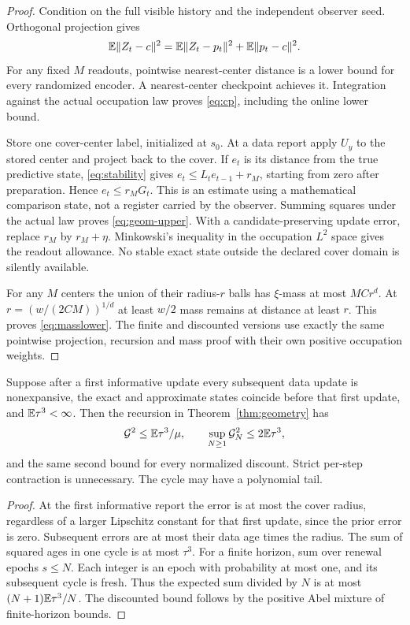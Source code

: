 \begin{proof}
Condition on the full visible history and the independent observer seed. Orthogonal projection gives
\[
 \mathbb E\lVert Z_t-c\rVert^2=\mathbb E\lVert Z_t-p_t\rVert^2+\mathbb E\lVert p_t-c\rVert^2.
\]
For any fixed $M$ readouts, pointwise nearest-center distance is a lower bound for every randomized encoder. A nearest-center checkpoint achieves it. Integration against the actual occupation law proves \eqref{eq:cp}, including the online lower bound.

Store one cover-center label, initialized at $s_0$. At a data report apply $U_y$ to the stored center and project back to the cover. If $e_t$ is its distance from the true predictive state, \eqref{eq:stability} gives $e_t\le L_te_{t-1}+r_M$, starting from zero after preparation. Hence $e_t\le r_MG_t$. This is an estimate using a mathematical comparison state, not a register carried by the observer. Summing squares under the actual law proves \eqref{eq:geom-upper}. With a candidate-preserving update error, replace $r_M$ by $r_M+\eta$. Minkowski's inequality in the occupation $L^2$ space gives the readout allowance. No stable exact state outside the declared cover domain is silently available.

For any $M$ centers the union of their radius-$r$ balls has $\xi$-mass at most $MC r^d$. At $r=(w/(2CM))^{1/d}$ at least $w/2$ mass remains at distance at least $r$. This proves \eqref{eq:masslower}. The finite and discounted versions use exactly the same pointwise projection, recursion and mass proof with their own positive occupation weights.
\end{proof}

\begin{corollary}\label{cor:noncontractive}
Suppose after a first informative update every subsequent data update is nonexpansive, the exact and approximate states coincide before that first update, and $\mathbb E\tau^3<\infty$. Then the recursion in Theorem~\ref{thm:geometry} has
\[
 \mathcal G^2\le\mathbb E\tau^3/\mu,\qquad
 \sup_{N\ge1}\mathcal G_N^2\le2\mathbb E\tau^3,
\]
and the same second bound for every normalized discount. Strict per-step contraction is unnecessary. The cycle may have a polynomial tail.
\end{corollary}
\begin{proof}
At the first informative report the error is at most the cover radius, regardless of a larger Lipschitz constant for that first update, since the prior error is zero. Subsequent errors are at most their data age times the radius. The sum of squared ages in one cycle is at most $\tau^3$. For a finite horizon, sum over renewal epochs $s\le N$. Each integer is an epoch with probability at most one, and its subsequent cycle is fresh. Thus the expected sum divided by $N$ is at most $(N+1)\mathbb E\tau^3/N$. The discounted bound follows by the positive Abel mixture of finite-horizon bounds.
\end{proof}

